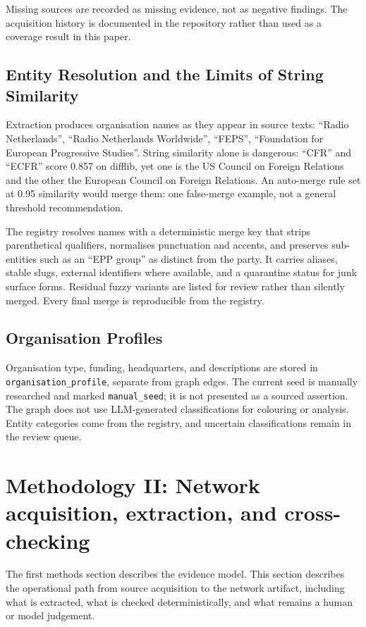 \documentclass[11pt,a4paper]{article}
\begin{document}
Missing sources are recorded as missing evidence, not as negative findings. The acquisition history is documented in the repository rather than used as a coverage result in this paper.

\subsection{Entity Resolution and the Limits of String Similarity}

Extraction produces organisation names as they appear in source texts: ``Radio Netherlands'', ``Radio Netherlands Worldwide'', ``FEPS'', ``Foundation for European Progressive Studies''. String similarity alone is dangerous: ``CFR'' and ``ECFR'' score 0.857 on difflib, yet one is the US Council on Foreign Relations and the other the European Council on Foreign Relations. An auto-merge rule set at 0.95 similarity would merge them: one false-merge example, not a general threshold recommendation.

The registry resolves names with a deterministic merge key that strips parenthetical qualifiers, normalises punctuation and accents, and preserves sub-entities such as an ``EPP group'' as distinct from the party. It carries aliases, stable slugs, external identifiers where available, and a quarantine status for junk surface forms. Residual fuzzy variants are listed for review rather than silently merged. Every final merge is reproducible from the registry.

\subsection{Organisation Profiles}

Organisation type, funding, headquarters, and descriptions are stored in \texttt{organisation\_profile}, separate from graph edges. The current seed is manually researched and marked \texttt{manual\_seed}; it is not presented as a sourced assertion. The graph does not use LLM-generated classifications for colouring or analysis. Entity categories come from the registry, and uncertain classifications remain in the review queue.

\section{Methodology II: Network acquisition, extraction, and cross-checking}

The first methods section describes the evidence model. This section describes the operational path from source acquisition to the network artifact, including what is extracted, what is checked deterministically, and what remains a human or model judgement.
\end{document}
